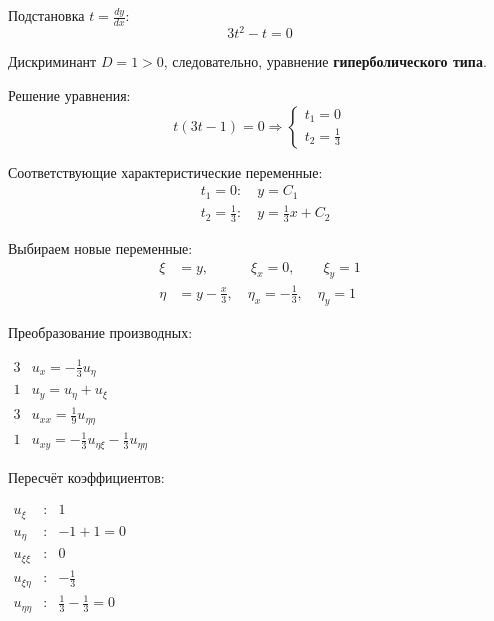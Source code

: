 \documentclass[a4paper,12pt]{article}
\begin{document}
Подстановка $t = \frac{dy}{dx}$:
\begin{equation*}
    3t^2 - t = 0 
\end{equation*}

Дискриминант $D = 1 > 0$, следовательно, уравнение \textbf{гиперболического типа}.

Решение уравнения:
\begin{equation*}
    t(3t - 1) = 0 \Rightarrow 
    \begin{cases}
    t_1 = 0 \\
    t_2 = \frac{1}{3}
    \end{cases}
\end{equation*}

Соответствующие характеристические переменные:
\begin{align*}
    &t_1 = 0: \quad y = C_1 \\
    &t_2 = \frac{1}{3}: \quad y = \frac{1}{3} x + C_2
\end{align*}

Выбираем новые переменные:
\begin{align*}
    \xi &= y, \quad \quad \quad \xi_x = 0,  \quad \quad \xi_y = 1 \\
    \eta &= y - \frac{x}{3}, \quad \eta_x = -\frac{1}{3},  \quad \eta_y = 1
\end{align*}

Преобразование производных:
\begin{flushleft}
\(
\begin{array}{r|l}
3 & u_x = -\frac{1}{3} u_{\eta} \\
1 & u_y = u_{\eta} + u_{\xi} \\
3 & u_{xx} = \frac{1}{9} u_{\eta\eta} \\
1 & u_{xy} = -\frac{1}{3} u_{\eta\xi} - \frac{1}{3} u_{\eta\eta}
\end{array}
\)
\end{flushleft}

Пересчёт коэффициентов:
\begin{flushleft}
\(
\begin{array}{rcl}
u_{\xi} & : & 1 \\
u_{\eta} & : & -1+1=0 \\
u_{\xi\xi} & : & 0\\
u_{\xi\eta} & : & -\frac{1}{3}\\
u_{\eta\eta} & : &  \frac{1}{3} -  \frac{1}{3} = 0
\end{array}
\)
\end{flushleft}
\end{document}
